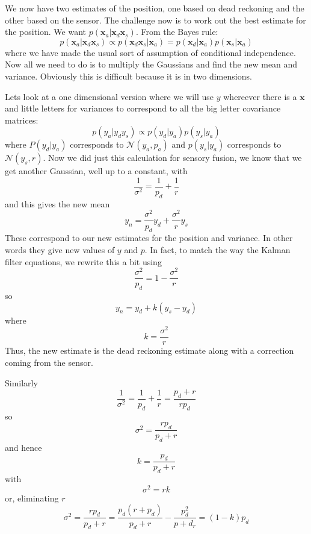 \documentclass[12pt]{article}
\begin{document}
We now have two estimates of the position, one based on dead reckoning
and the other based on the sensor. The challenge now is to work out
the best estimate for the position. We want
$p(\mathbf{x}_a|\mathbf{x}_d\mathbf{x}_s)$. From the Bayes rule:
\begin{equation}
p(\mathbf{x}_a|\mathbf{x}_d\mathbf{x}_s)\propto p(\mathbf{x}_d\mathbf{x}_s|\mathbf{x}_a)=p(\mathbf{x}_d|\mathbf{x}_a)p(\mathbf{x}_s|\mathbf{x}_a)
\end{equation}
where we have made the usual sort of assumption of conditional
independence. Now all we need to do is to multiply the Gaussians and
find the new mean and variance. Obviously this is difficult because it
is in two dimensions. 

Lets look at a one dimensional version where we will use $y$ whereever
there is a $\mathbf{x}$ and little letters for variances to correspond
to all the big letter covariance matrices:
\begin{equation}
p(y_a|y_dy_s)\propto p(y_d|y_a)p(y_s|y_a)
\end{equation}
where $P(y_d|y_a)$ corresponds to $\mathcal{N}(y_a,p_a)$ and
$p(y_s|y_a)$ corresponds to $\mathcal{N}(y_s,r)$. Now we did just this calculation for sensory fusion, we know that we get another Gaussian, well up to a constant, with 
\begin{equation}
\frac{1}{\sigma^2}=\frac{1}{p_d}+\frac{1}{r}
\end{equation}
and this gives the new mean
\begin{equation}
y_n=\frac{\sigma^2}{p_d}y_d+\frac{\sigma^2}{r}y_s
\end{equation}
These correspond to our new estimates for the position and
variance. In other words they give new values of $y$ and $p$. In fact, to match the way the Kalman filter equations, we rewrite this a bit using
\begin{equation}
\frac{\sigma^2}{p_d}=1-\frac{\sigma^2}{r}
\end{equation}
so
\begin{equation}
y_n=y_d+k(y_s-y_d)
\end{equation}
where
\begin{equation}
k=\frac{\sigma^2}{r}
\end{equation}
Thus, the new estimate is the dead reckoning estimate along with a correction coming from the sensor. 

Similarly
\begin{equation}
\frac{1}{\sigma^2}=\frac{1}{p_d}+\frac{1}{r}=\frac{p_d+r}{rp_d}
\end{equation}
so 
\begin{equation}
\sigma^2=\frac{rp_d}{p_d+r}
\end{equation}
and hence
\begin{equation}
k=\frac{p_d}{p_d+r}
\end{equation}
with
\begin{equation}
\sigma^2=rk
\end{equation}
or, eliminating $r$
\begin{equation}
\sigma^2=\frac{rp_d}{p_d+r}=\frac{p_d(r+p_d)}{p_d+r}-\frac{p_d^2}{p+d_r}=(1-k)p_d
\end{equation}
\end{document}
